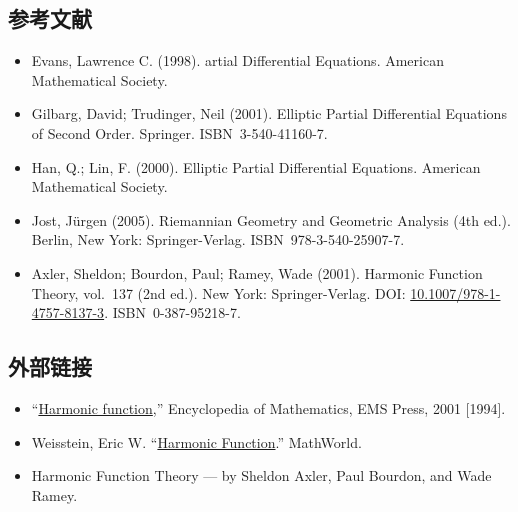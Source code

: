 \subsection{参考文献}
\begin{itemize}
  \item Evans, Lawrence C. (1998). artial Differential Equations. American Mathematical Society.
  \item Gilbarg, David; Trudinger, Neil (2001). Elliptic Partial Differential Equations of Second Order. Springer. ISBN~3-540-41160-7.
  \item Han, Q.; Lin, F. (2000). Elliptic Partial Differential Equations. American Mathematical Society.
  \item Jost, Jürgen (2005). Riemannian Geometry and Geometric Analysis (4th ed.). Berlin, New York: Springer-Verlag. ISBN~978-3-540-25907-7.
  \item Axler, Sheldon; Bourdon, Paul; Ramey, Wade (2001). Harmonic Function Theory, vol.~137 (2nd ed.). New York: Springer-Verlag.  
  DOI: \href{https://doi.org/10.1007/978-1-4757-8137-3}{10.1007/978-1-4757-8137-3}. ISBN~0-387-95218-7.
\end{itemize}
\subsection{外部链接}
\begin{itemize}
  \item “\href{https://encyclopediaofmath.org/wiki/Harmonic_function}{Harmonic function},” Encyclopedia of Mathematics, EMS Press, 2001 [1994].
  \item Weisstein, Eric W. “\href{https://mathworld.wolfram.com/HarmonicFunction.html}{Harmonic Function}.” MathWorld.
  \item Harmonic Function Theory — by Sheldon Axler, Paul Bourdon, and Wade Ramey.
\end{itemize}










